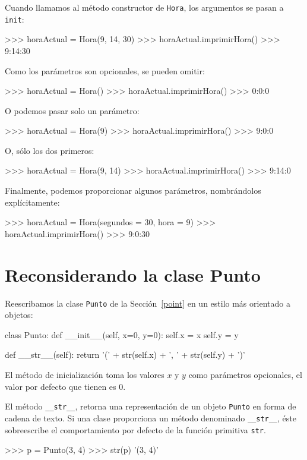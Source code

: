 
Cuando llamamos al método constructor de \texttt{Hora}, los argumentos
se pasan a \texttt{init}:
\begin{pyconcode}
>>> horaActual = Hora(9, 14, 30)
>>> horaActual.imprimirHora()
>>> 9:14:30
\end{pyconcode}

Como los parámetros son opcionales, se pueden omitir:
\begin{pyconcode}
>>> horaActual = Hora()
>>> horaActual.imprimirHora()
>>> 0:0:0
\end{pyconcode}

O podemos pasar solo un parámetro:
\begin{pyconcode}
>>> horaActual = Hora(9)
>>> horaActual.imprimirHora()
>>> 9:0:0
\end{pyconcode}

O, sólo los dos primeros:
\begin{pyconcode}
>>> horaActual = Hora(9, 14)
>>> horaActual.imprimirHora()
>>> 9:14:0
\end{pyconcode}

Finalmente, podemos proporcionar algunos parámetros, nombrándolos
explícitamente:
\begin{pyconcode}
>>> horaActual = Hora(segundos = 30, hora = 9)
>>> horaActual.imprimirHora()
>>> 9:0:30
\end{pyconcode}

\section{Reconsiderando la clase Punto}

 

Reescribamos la clase \texttt{Punto} de la Sección~\ref{point} en
un estilo más orientado a objetos:
\begin{pythoncode}
class Punto:
  def __init__(self, x=0, y=0):
    self.x = x
    self.y = y

  def __str__(self):
    return '(' + str(self.x) + ', ' + str(self.y) + ')'
\end{pythoncode}

El método de inicialización toma los valores $x$ y $y$ como parámetros
opcionales, el valor por defecto que tienen es 0.

El método \texttt{\_\_str\_\_}, retorna una representación de un objeto
\texttt{Punto} en forma de cadena de texto. Si una clase proporciona
un método denominado \texttt{\_\_str\_\_}, éste sobreescribe el comportamiento
por defecto de la función primitiva \texttt{str}.
\begin{pyconcode}
>>> p = Punto(3, 4)
>>> str(p)
'(3, 4)'
\end{pyconcode}

